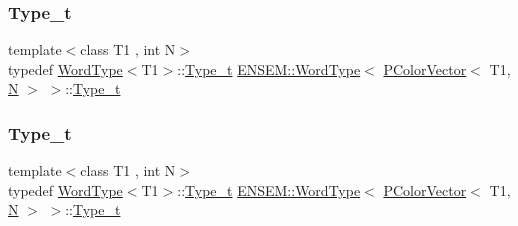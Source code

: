\subsubsection{\texorpdfstring{Type\_t}{Type\_t}\hspace{0.1cm}{\footnotesize\ttfamily [1/3]}}
{\footnotesize\ttfamily template$<$class T1 , int N$>$ \\
typedef \mbox{\hyperlink{structENSEM_1_1WordType}{Word\+Type}}$<$T1$>$\+::\mbox{\hyperlink{structENSEM_1_1WordType_3_01PColorVector_3_01T1_00_01N_01_4_01_4_a86e73ce3277cd28d9e0550e1989ad245}{Type\+\_\+t}} \mbox{\hyperlink{structENSEM_1_1WordType}{E\+N\+S\+E\+M\+::\+Word\+Type}}$<$ \mbox{\hyperlink{classENSEM_1_1PColorVector}{P\+Color\+Vector}}$<$ T1, \mbox{\hyperlink{adat__devel_2lib_2hadron_2operator__name__util_8cc_a7722c8ecbb62d99aee7ce68b1752f337}{N}} $>$ $>$\+::\mbox{\hyperlink{structENSEM_1_1WordType_3_01PColorVector_3_01T1_00_01N_01_4_01_4_a86e73ce3277cd28d9e0550e1989ad245}{Type\+\_\+t}}}

\mbox{\label{structENSEM_1_1WordType_3_01PColorVector_3_01T1_00_01N_01_4_01_4_a86e73ce3277cd28d9e0550e1989ad245}} 
\subsubsection{\texorpdfstring{Type\_t}{Type\_t}\hspace{0.1cm}{\footnotesize\ttfamily [2/3]}}
{\footnotesize\ttfamily template$<$class T1 , int N$>$ \\
typedef \mbox{\hyperlink{structENSEM_1_1WordType}{Word\+Type}}$<$T1$>$\+::\mbox{\hyperlink{structENSEM_1_1WordType_3_01PColorVector_3_01T1_00_01N_01_4_01_4_a86e73ce3277cd28d9e0550e1989ad245}{Type\+\_\+t}} \mbox{\hyperlink{structENSEM_1_1WordType}{E\+N\+S\+E\+M\+::\+Word\+Type}}$<$ \mbox{\hyperlink{classENSEM_1_1PColorVector}{P\+Color\+Vector}}$<$ T1, \mbox{\hyperlink{adat__devel_2lib_2hadron_2operator__name__util_8cc_a7722c8ecbb62d99aee7ce68b1752f337}{N}} $>$ $>$\+::\mbox{\hyperlink{structENSEM_1_1WordType_3_01PColorVector_3_01T1_00_01N_01_4_01_4_a86e73ce3277cd28d9e0550e1989ad245}{Type\+\_\+t}}}

\mbox{\label{structENSEM_1_1WordType_3_01PColorVector_3_01T1_00_01N_01_4_01_4_a86e73ce3277cd28d9e0550e1989ad245}} 
